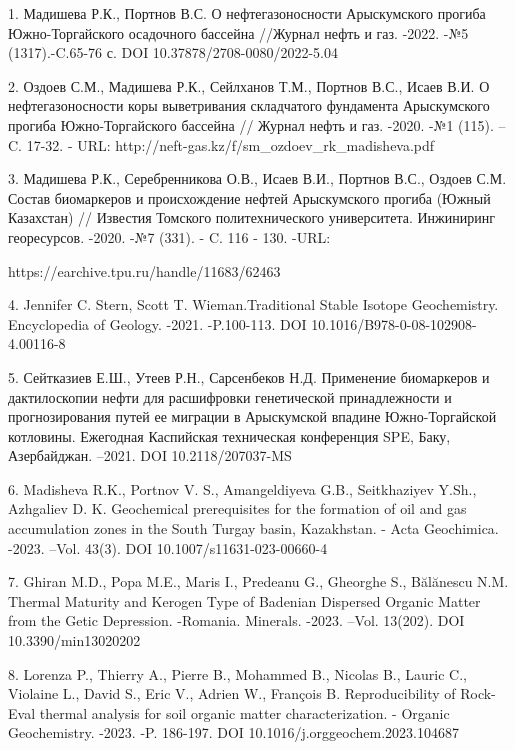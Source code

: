 \begin{noparindent}
1.
  Мадишева Р.К., Портнов В.С. О нефтегазоносности Арыскумского прогиба
  Южно-Торгайского осадочного бассейна //Журнал нефть и газ. -2022. -№5
  (1317).-C.65-76 с. DOI 10.37878/2708-0080/2022-5.04

2.
  Оздоев С.М., Мадишева Р.К., Сейлханов Т.М., Портнов В.С., Исаев В.И. О
  нефтегазоносности коры выветривания складчатого фундамента
  Арыскумского прогиба Южно-Торгайского бассейна // Журнал нефть и газ.
  -2020. -№1 (115). --C. 17-32. - URL:
  http://neft-gas.kz/f/sm\_ozdoev\_rk\_madisheva.pdf

3.
  Мадишева Р.К., Серебренникова О.В., Исаев В.И., Портнов В.С., Оздоев
  С.М. Состав биомаркеров и происхождение нефтей Арыскумского прогиба
  (Южный Казахстан) // Известия Томского политехнического университета.
  Инжиниринг георесурсов. -2020. -№7 (331). - C. 116 - 130. -URL:

  https://earchive.tpu.ru/handle/11683/62463

4.
  Jennifer C. Stern, Scott T. Wieman.Traditional Stable Isotope
  Geochemistry. Encyclopedia of Geology. -2021. -P.100-113. DOI
  10.1016/B978-0-08-102908-4.00116-8

5.
  Сейтказиев Е.Ш., Утеев Р.Н., Сарсенбеков Н.Д. Применение биомаркеров и
  дактилоскопии нефти для расшифровки генетической принадлежности и
  прогнозирования путей ее миграции в Арыскумской впадине
  Южно-Торгайской котловины. Ежегодная Каспийская техническая
  конференция SPE, Баку, Азербайджан. --2021. DOI 10.2118/207037-MS

6.
  Madisheva R.K., Portnov V. S., Amangeldiyeva G.B., Seitkhaziyev Y.Sh.,
  Azhgaliev D. K. Geochemical prerequisites for the formation of oil and
  gas accumulation zones in the South Turgay basin, Kazakhstan. - Acta
  Geochimica. -2023. --Vol. 43(3). DOI 10.1007/s11631-023-00660-4

7.
  Ghiran M.D., Popa M.E., Maris I., Predeanu G., Gheorghe S., Bălănescu
  N.M. Thermal Maturity and Kerogen Type of Badenian Dispersed Organic
  Matter from the Getic Depression. -Romania. Minerals. -2023. --Vol.
  13(202). DOI 10.3390/min13020202

8.
  Lorenza P., Thierry A., Pierre B., Mohammed B., Nicolas B., Lauric C.,
  Violaine L., David S., Eric V., Adrien W., François B. Reproducibility
  of Rock-Eval thermal analysis for soil organic matter
  characterization. - Organic Geochemistry. -2023. -P. 186-197. DOI
  10.1016/j.orggeochem.2023.104687


\end{noparindent}
